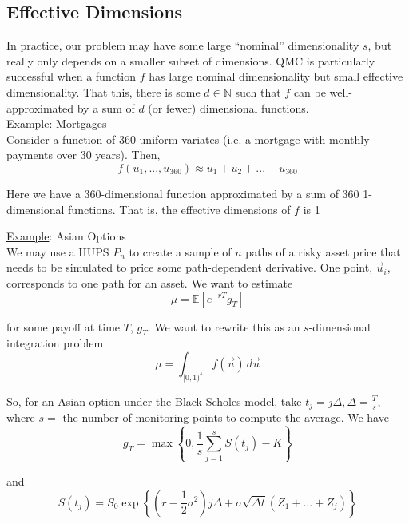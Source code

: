 \documentclass[12pt]{article}
\newlength\tindent
\renewcommand{\indent}{\hspace*{\tindent}}
\newcommand{\N}{\mathbb N}
\newcommand{\E}{\mathbb E}
\begin{document}
\subsection{Effective Dimensions}

\indent In practice, our problem may have some large ``nominal'' dimensionality $s$, but really only depends on a smaller subset of dimensions. QMC is particularly successful when a function $f$ has large nominal dimensionality but small effective dimensionality. That this, there is some $d\in\N$ such that $f$ can be well-approximated by a sum of $d$ (or fewer) dimensional functions. \\

\underline{Example}: Mortgages \\

\indent Consider a function of 360 uniform variates (i.e. a mortgage with monthly payments over 30 years). Then,
\begin{equation*}
	f(u_1, ..., u_{360}) \approx u_1 + u_2 + ... + u_{360}
\end{equation*}

\indent Here we have a 360-dimensional function approximated by a sum of 360 1-dimensional functions. That is, the effective dimensions of $f$ is 1

\underline{Example}: Asian Options \\

\indent We may use a HUPS $P_n$ to create a sample of $n$ paths of a risky asset price that needs to be simulated to price some path-dependent derivative. One point, $\vec{u}_i$, corresponds to one path for an asset. We want to estimate
\begin{equation*}
	\mu = \E \left[ e^{-rT} g_T \right] 
\end{equation*}

for some payoff at time $T$, $g_T$. We want to rewrite this as an $s$-dimensional integration problem
\begin{equation*}
	\mu = \int_{[0,1)^s} f(\vec{u})\,d\vec{u}
\end{equation*}

\indent So, for an Asian option under the Black-Scholes model, take $t_j = j\Delta, \Delta = \frac{T}{s}$, where $s = $ the number of monitoring points to compute the average. We have
\begin{equation*}
	g_T = \max\left\{0, \frac{1}{s}\sum^s_{j = 1} S(t_j) - K \right\}
\end{equation*}

and
\begin{equation*}
	S(t_j) = S_0 \exp \left\{ \left(r - \frac{1}{2}\sigma^2\right) j\Delta + \sigma\sqrt{\Delta t} \left(Z_1 + ... + Z_j\right) \right\}
\end{equation*}
\end{document}
